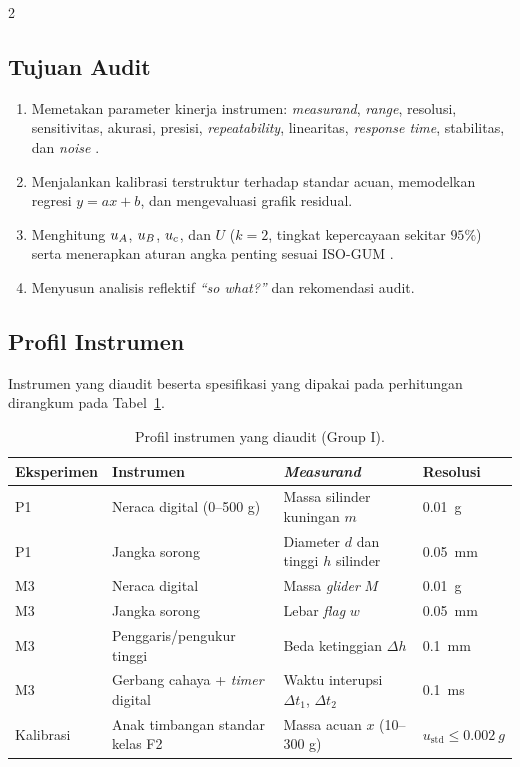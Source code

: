 \documentclass[a4paper, 12pt]{article}
\begin{document}
\begin{multicols}{2}
        \subsection{Tujuan Audit}
        \begin{enumerate}
            \item Memetakan parameter kinerja instrumen: \textit{measurand}, \textit{range}, resolusi, sensitivitas, akurasi, presisi, \textit{repeatability}, linearitas, \textit{response time}, stabilitas, dan \textit{noise} \parencite{JCGM2012VIM}.
            \item Menjalankan kalibrasi terstruktur terhadap standar acuan, memodelkan regresi $y=ax+b$, dan mengevaluasi grafik residual.
            \item Menghitung $u_{A}$, $u_{B}$, $u_{c}$, dan $U$ ($k=2$, tingkat kepercayaan sekitar $95\%$) serta menerapkan aturan angka penting sesuai ISO-GUM \parencite{JCGM2008GUM}.
            \item Menyusun analisis reflektif \textit{``so what?''} dan rekomendasi audit.
        \end{enumerate}

        \subsection{Profil Instrumen}
        Instrumen yang diaudit beserta spesifikasi yang dipakai pada perhitungan dirangkum pada Tabel~\ref{tab:profil}.
\end{multicols}

\begin{table}[H]
\centering
\singlespacing
\caption{Profil instrumen yang diaudit (Group I).}
\label{tab:profil}
\small
\begin{tabularx}{\textwidth}{@{}l l X l@{}}
\toprule
\textbf{Eksperimen} & \textbf{Instrumen} & \textbf{\textit{Measurand}} & \textbf{Resolusi}\\
\midrule
P1 & Neraca digital (0--500 g) & Massa silinder kuningan $m$ & \SI{0,01}{g}\\
P1 & Jangka sorong & Diameter $d$ dan tinggi $h$ silinder & \SI{0,05}{mm}\\
M3 & Neraca digital & Massa \textit{glider} $M$ & \SI{0,01}{g}\\
M3 & Jangka sorong & Lebar \textit{flag} $w$ & \SI{0,05}{mm}\\
M3 & Penggaris/pengukur tinggi & Beda ketinggian $\Delta h$ & \SI{0,1}{mm}\\
M3 & Gerbang cahaya + \textit{timer} digital & Waktu interupsi $\Delta t_1$, $\Delta t_2$ & \SI{0,1}{ms}\\
Kalibrasi & Anak timbangan standar kelas F2 & Massa acuan $x$ (10--300 g) & $u_{\mathrm{std}}\le\SI{0,002}{g}$\\
\bottomrule
\end{tabularx}
\end{table}
\end{document}
